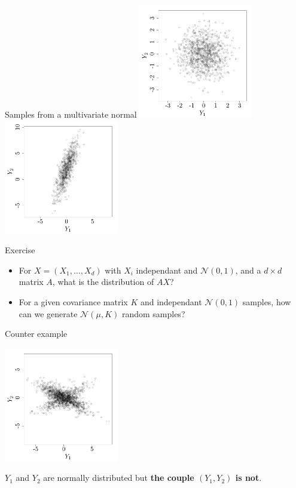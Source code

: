 \begin{frame}{}
\begin{exampleblock}{Samples from a multivariate normal}
 \includegraphics[height=5cm]{1_stat_models/figures/R/MVN_gaussvec2} \quad \includegraphics[height=5cm]{1_stat_models/figures/R/MVN_gaussvec1}
\end{exampleblock}
\vspace{-5mm}
\begin{exampleblock}{Exercise}
\begin{itemize}
  \item For $X=(X_1,\dots,X_d)$ with $X_i$ independant and $\mathcal{N}(0,1)$, and a $d \times d$ matrix $A$, what is the distribution of $AX$?
  \item For a given covariance matrix $K$ and independant $\mathcal{N}(0,1)$ samples, how can we generate $\mathcal{N}(\mu,K)$ random samples?
\end{itemize}
\end{exampleblock}
\end{frame}

\begin{frame}{}
\begin{exampleblock}{Counter example}
\begin{center}
 \includegraphics[height=5cm]{1_stat_models/figures/R/MVN_gaussvec3}
\end{center}
$Y_1$ and $Y_2$ are normally distributed but \textbf{the couple $(Y_1,Y_2)$ is not}.
\end{exampleblock}
\end{frame}


